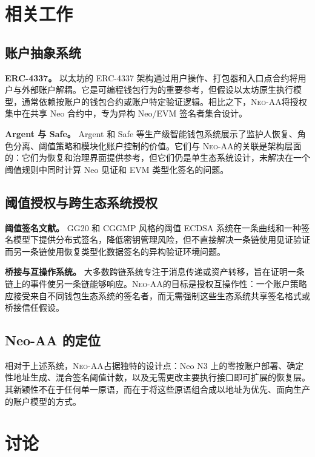\documentclass[10pt]{article}
\newcommand{\sys}{\textsc{Neo-AA}}
\begin{document}
\section{相关工作}

\subsection{账户抽象系统}

\textbf{ERC-4337。} 以太坊的 ERC-4337 架构通过用户操作、打包器和入口点合约将用户与外部账户解耦。它是可编程钱包行为的重要参考，但假设以太坊原生执行模型，通常依赖按账户的钱包合约或账户特定验证逻辑。相比之下，\sys 将授权集中在共享 Neo 合约中，专为异构 Neo/EVM 签名者集合设计。

\textbf{Argent 与 Safe。} Argent 和 Safe 等生产级智能钱包系统展示了监护人恢复、角色分离、阈值策略和模块化账户控制的价值。它们与 \sys 的关联是架构层面的：它们为恢复和治理界面提供参考，但它们仍是单生态系统设计，未解决在一个阈值规则中同时计算 Neo 见证和 EVM 类型化签名的问题。

\subsection{阈值授权与跨生态系统授权}

\textbf{阈值签名文献。} GG20 和 CGGMP 风格的阈值 ECDSA 系统在一条曲线和一种签名模型下提供分布式签名，降低密钥管理风险，但不直接解决一条链使用见证验证而另一条链使用恢复类型化数据签名的异构验证环境问题。

\textbf{桥接与互操作系统。} 大多数跨链系统专注于消息传递或资产转移，旨在证明一条链上的事件使另一条链能够响应。\sys 的目标是授权互操作性：一个账户策略应接受来自不同钱包生态系统的签名者，而无需强制这些生态系统共享签名格式或桥接信任假设。

\subsection{Neo-AA 的定位}

相对于上述系统，\sys 占据独特的设计点：Neo N3 上的零按账户部署、确定性地址生成、混合签名阈值计数，以及无需更改主要执行接口即可扩展的恢复层。其新颖性不在于任何单一原语，而在于将这些原语组合成以地址为优先、面向生产的账户模型的方式。

\section{讨论}
\end{document}
